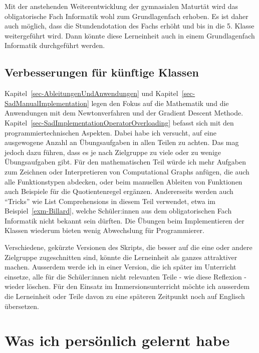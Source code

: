 \documentclass[
  a4paper,
  DIV=11]{scrreprt}
\theoremstyle{definition}
\theoremstyle{definition}
\theoremstyle{remark}
\begin{document}
Mit der anstehenden Weiterentwicklung der gymnasialen Maturtät wird das
obligatorische Fach Informatik wohl zum Grundlagenfach erhoben. Es ist
daher auch möglich, dass die Stundendotation des Fachs erhöht und bis in
die 5. Klasse weitergeführt wird. Dann könnte diese Lerneinheit auch in
einem Grundlagenfach Informatik durchgeführt werden.

\hypertarget{verbesserungen-fuxfcr-kuxfcnftige-klassen}{%
\subsection{Verbesserungen für künftige
Klassen}\label{verbesserungen-fuxfcr-kuxfcnftige-klassen}}

Kapitel~\ref{sec-AbleitungenUndAnwendungen} und
Kapitel~\ref{sec-SadManualImplementation} legen den Fokus auf die
Mathematik und die Anwendungen mit dem Newtonverfahren und der Gradient
Descent Methode. Kapitel~\ref{sec-SadImplementationOperatorOverloading}
befasst sich mit den programmiertechnischen Aspekten. Dabei habe ich
versucht, auf eine ausgewogene Anzahl an Übungsaufgaben in allen Teilen
zu achten. Das mag jedoch dazu führen, dass es je nach Zielgruppe zu
viele oder zu wenige Übungsaufgaben gibt. Für den mathematischen Teil
würde ich mehr Aufgaben zum Zeichnen oder Interpretieren von
Computational Graphs anfügen, die auch alle Funktionstypen abdecken,
oder beim manuellen Ableiten von Funktionen auch Beispiele für die
Quotientenregel ergänzen. Andererseits werden auch ``Tricks'' wie List
Comprehensions in diesem Teil verwendet, etwa im
Beispiel~\ref{exm-Billard}, welche Schüler:innen aus dem obligatorischen
Fach Informatik nicht bekannt sein dürften. Die Übungen beim
Implementieren der Klassen wiederum bieten wenig Abwechslung für
Programmierer.

Verschiedene, gekürzte Versionen des Skripts, die besser auf die eine
oder andere Zielgruppe zugeschnitten sind, könnte die Lerneinheit als
ganzes attraktiver machen. Ausserdem werde ich in einer Version, die ich
später im Unterricht einsetze, alle für die Schüler:innen nicht
relevanten Teile - wie diese Reflexion - wieder löschen. Für den Einsatz
im Immersionsunterricht möchte ich ausserdem die Lerneinheit oder Teile
davon zu eine späteren Zeitpunkt noch auf Englisch übersetzen.

\hypertarget{was-ich-persuxf6nlich-gelernt-habe}{%
\section{Was ich persönlich gelernt
habe}\label{was-ich-persuxf6nlich-gelernt-habe}}
\end{document}
